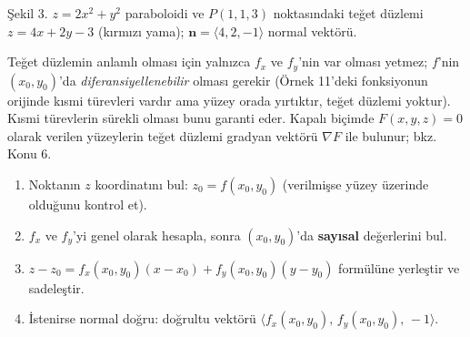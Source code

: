 \begin{center}
\end{center}
\begin{center}
{\small Şekil 3. $z=2x^2+y^2$ paraboloidi ve $P(1,1,3)$ noktasındaki teğet düzlemi $z=4x+2y-3$ (kırmızı yama);
$\mathbf n=\langle4,2,-1\rangle$ normal vektörü.}
\end{center}

\begin{bilgi}
Teğet düzlemin anlamlı olması için yalnızca $f_x$ ve $f_y$'nin var olması yetmez; $f$'nin $(x_0,y_0)$'da
\emph{diferansiyellenebilir} olması gerekir (Örnek 11'deki fonksiyonun orijinde kısmi türevleri vardır ama yüzey orada
yırtıktır, teğet düzlemi yoktur). Kısmi türevlerin sürekli olması bunu garanti eder.
Kapalı biçimde $F(x,y,z)=0$ olarak verilen yüzeylerin teğet düzlemi gradyan vektörü $\nabla F$ ile bulunur; bkz. Konu 6.
\end{bilgi}

\begin{teorem}
\begin{enumerate}
  \item Noktanın $z$ koordinatını bul: $z_0=f(x_0,y_0)$ (verilmişse yüzey üzerinde olduğunu kontrol et).
  \item $f_x$ ve $f_y$'yi genel olarak hesapla, sonra $(x_0,y_0)$'da \textbf{sayısal} değerlerini bul.
  \item $z-z_0=f_x(x_0,y_0)(x-x_0)+f_y(x_0,y_0)(y-y_0)$ formülüne yerleştir ve sadeleştir.
  \item İstenirse normal doğru: doğrultu vektörü $\langle f_x(x_0,y_0),\,f_y(x_0,y_0),\,-1\rangle$.
\end{enumerate}
\end{teorem}

